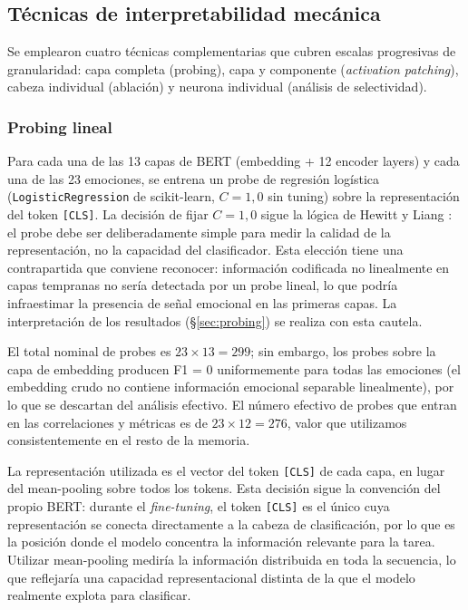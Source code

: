 \subsection{Técnicas de interpretabilidad mecánica}
\label{sec:met-interpretabilidad}

Se emplearon cuatro técnicas complementarias que cubren escalas progresivas de
granularidad: capa completa (probing), capa y componente (\emph{activation patching}),
cabeza individual (ablación) y neurona individual (análisis de selectividad).

\subsubsection{Probing lineal}
\label{sec:met-probing}

Para cada una de las 13 capas de BERT (embedding + 12 encoder layers) y cada
una de las 23 emociones, se entrena un probe de regresión logística
(\texttt{LogisticRegression} de scikit-learn, $C = 1{,}0$ sin tuning) sobre
la representación del token \texttt{[CLS]}. La decisión de fijar $C = 1{,}0$
sigue la lógica de Hewitt y Liang \cite{hewitt2019designing}: el probe debe
ser deliberadamente simple para medir la calidad de la representación, no la
capacidad del clasificador. Esta elección tiene una contrapartida que conviene
reconocer: información codificada no linealmente en capas tempranas no sería
detectada por un probe lineal, lo que podría infraestimar la presencia de
señal emocional en las primeras capas. La interpretación de los resultados
(\S\ref{sec:probing}) se realiza con esta cautela.

El total nominal de probes es $23 \times 13 = 299$; sin embargo, los probes
sobre la capa de embedding producen F1 = 0 uniformemente para todas las
emociones (el embedding crudo no contiene información emocional separable
linealmente), por lo que se descartan del análisis efectivo. El número
efectivo de probes que entran en las correlaciones y métricas es de
$23 \times 12 = 276$, valor que utilizamos consistentemente en el resto de la
memoria.

La representación utilizada es el vector del token \texttt{[CLS]} de cada
capa, en lugar del mean-pooling sobre todos los tokens. Esta decisión sigue
la convención del propio BERT: durante el \emph{fine-tuning}, el token \texttt{[CLS]}
es el único cuya representación se conecta directamente a la cabeza de
clasificación, por lo que es la posición donde el modelo concentra la
información relevante para la tarea. Utilizar mean-pooling mediría la
información distribuida en toda la secuencia, lo que reflejaría una capacidad
representacional distinta de la que el modelo realmente explota para
clasificar.

